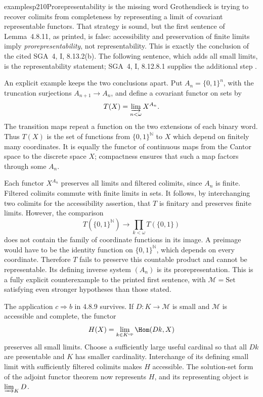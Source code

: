 \begin{dcomment}{examples}{p210}{Prorepresentability is the missing word}
Grothendieck is trying to recover colimits from completeness by representing a limit of covariant representable functors. That strategy is sound, but the first sentence of Lemma~4.8.11, as printed, is false: accessibility and preservation of finite limits imply \emph{prorepresentability}, not representability. This is exactly the conclusion of the cited SGA~4, I, 8.13.2(b). The following sentence, which adds all small limits, is the representability statement; SGA~4, I, 8.12.8.1 supplies the additional step \citep{SGA4I1972}.

An explicit example keeps the two conclusions apart. Put $A_n=\{0,1\}^n$, with the truncation surjections $A_{n+1}\to A_n$, and define a covariant functor on sets by
\[
 T(X)=\varinjlim_{n<\omega} X^{A_n}.
\]
The transition maps repeat a function on the two extensions of each binary word. Thus $T(X)$ is the set of functions from $\{0,1\}^{\mathbb N}$ to $X$ which depend on finitely many coordinates. It is equally the functor of continuous maps from the Cantor space to the discrete space $X$; compactness ensures that such a map factors through some $A_n$.

Each functor $X^{A_n}$ preserves all limits and filtered colimits, since $A_n$ is finite. Filtered colimits commute with finite limits in sets. It follows, by interchanging two colimits for the accessibility assertion, that $T$ is finitary and preserves finite limits. However, the comparison
\[
 T(\{0,1\}^{\mathbb N})\longrightarrow
 \prod_{k<\omega}T(\{0,1\})
\]
does not contain the family of coordinate functions in its image. A preimage would have to be the identity function on $\{0,1\}^{\mathbb N}$, which depends on every coordinate. Therefore $T$ fails to preserve this countable product and cannot be representable. Its defining inverse system $(A_n)$ is its prorepresentation. This is a fully explicit counterexample to the printed first sentence, with $\mathcal M=\mathrm{Set}$ satisfying even stronger hypotheses than those stated.

The application $c\Rightarrow b$ in 4.8.9 survives. If $D:K\to\mathcal M$ is small and $\mathcal M$ is accessible and complete, the functor
\[
 H(X)=\lim_{k\in K^{\mathrm{op}}}\Hom(Dk,X)
\]
preserves all small limits. Choose a sufficiently large useful cardinal so that all $Dk$ are presentable and $K$ has smaller cardinality. Interchange of its defining small limit with sufficiently filtered colimits makes $H$ accessible. The solution-set form of the adjoint functor theorem now represents $H$, and its representing object is $\varinjlim_KD$.


\end{dcomment}
